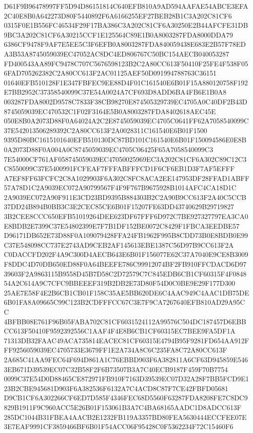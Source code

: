 \documentclass[UTF8,fontset=fandol,zihao=-4,a4paper]{ctexart}
\begin{document}
{{D61F9B96478997FF5D94D86151814C640EFB810A9AD594AAFAE54ABCE3EFA2C40E8B0A642273D80F5440892F6A6166255EF27BEB28B1C3A202C81CF6
0315F0E1B556FC46534F29F17BA386C3A202C81CF6A30250E2B44AFCFE31DB9BC3A202C81CF6A30215CCF1E125564C89E1B0A8003287FDA8000DDA79
6386CF9478F9AF7E5EE5C3F6EFB0A8003287FDA840059438E683E2B57F78EDA3B53A8745059039EC47052AC8DC4ED806767C50BC154AECB040053287
FD400543AA89FC9478C707C5676598123B2C2A80CC613F50410F25FE4F538F056FAD705262382C2A80CC613F2AC01125AEF50D091994788763C36151
01640EFB510128F1E347FBFEC9EE88D4F01C161540E6B01F15A880120758F192E7BB2952C37358540099C37E54A0024A7CF693D8ADD6BA4FB6E1B0A8
003287FDA8002D9578C7833F38CB98270E874505329739EC4705A0C40DF2B43D8745059039EC470532C1F02F3164E5B0A8003287FDA8402618AEC45E
050E8B0A2073D88F0A64024A2C2E8745059039EC4705C0641FF62A7058540099C37E542013506289392C2A80CC613F2A0028311C161540E6B01F1500
9395D80BC1615101640EFB510130DC87BD101C161540E6B01F150094586E0E8B0A2073D88F0A004A0C8745059039EC4705C06425F65A7058540099C3
7E54000CF761AF058745059039EC47050025969EC3A202C81CF6A302C89C12C3C8550099C37E5400991FCFEAF7FFFABFFFCD1F6CF6EB1D3F7AF5EFFF
A7EF8FF63FCFC2C8A1029903F6A302C8FC8ACA2EE147953DF28FFAD1ABFF57A78D1C2A9039EC072A90799567F4F9F767B9675928B1014AFC4CA18D1C
2A9039EC072A90F911E3CD23BD9395B884303B2C2A90B9CC613F2A40C5CCB37DD24B894B0BB3C3E2CEC85CE6B01F15207FE63DD43740629B29719827
3B2CEE8CCC650EFB51019264DEE623DF67FFF6D972C7BE927327797EA3CA0E8BDB2E7399C37E54802399E7F7B1DF152BE0072C8429F1FBCA3EEDBE57
D96171DB652E73D88F0A109079428FFA24FB1962F995B8CDD73B0E8BDB0E99C37E548098CC737E2743AD9CEB2AF145613EBE1387C56D97B9CC613F2A
C0DACCFD202F4A9C300D4AECB643E6B01F156077E62C37A7040E9CE8B3009F8DDC4D70DB650ED88F0A64BEEFE786C99912074BF2FB910FFCDACD6D97
39603F2A9863115B9558D45B7D58C2D72579C7C845EDB6CB1CF60315F4F084854A2C614A9C7CFC9BBEEEF319B2DB2E73D80F54D0C0BE9E29F177D300
25AE7E58F4E2B6CB1CB01F158C35AE5BB620DE6C4AAC949C4AAC1DB75DE6B01FA8A09665C99C123B2CDFFFCC67C3E7F9CA7267640EFB810AD29A95CC
4BFBB08E761F96B05FABA702C81CF6031524112A99576C504DC187457D6EBBCC613F50410F9592392556C1AAF4F4E8B6CB1CF60315EC7BEE9FA5DF1A
71313DB32FAAC49ACA735814EACEC81CF60315E4794B95F9281FD654AA912FFF9256059039EC4705733E3679FF1E2A734A8C6C235FA8C72A80CC613F
2A685C41AA9FEC64F694D861A1C76EBBD903F6A382811A6CF63D945859E5463EB671D39539EC07C32B58F2F6B73507B3A7C40ECB9187F459F70B7754
0099C37E54D0D88465CE872971FB910F7163D39539EC07D32A28F7BB5FCD9E123B2CBE945681D903F6A382536F6132A7C4ACD8C87F7CE42FBFD05681
D9CB1CF6A302266CF6ED7D585F4346FEC68D5560F63287FDA8208FE7C8DC9829B1911F9C960ACC5E26B01F153061B3A7C4BA68165AADC1D8ADCC613F
285DC1044B31FBEA4AACB2E1232FB119A3357BD80FEA5630444ECCFEE07E3E7EAF9991CF3859466BF6B01F54ACC06F95428C0F5362234F72C15460F6
}}
\end{document}
